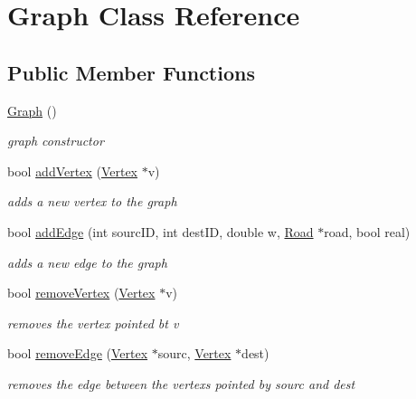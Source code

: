 \hypertarget{class_graph}{}\section{Graph Class Reference}
\label{class_graph}
\subsection*{Public Member Functions}
\begin{DoxyCompactItemize}
\item 
\hypertarget{class_graph_ae4c72b8ac4d693c49800a4c7e273654f}{}\label{class_graph_ae4c72b8ac4d693c49800a4c7e273654f} 
\hyperlink{class_graph_ae4c72b8ac4d693c49800a4c7e273654f}{Graph} ()
\begin{DoxyCompactList}\small\item\em graph constructor \end{DoxyCompactList}\item 
bool \hyperlink{class_graph_a59a5e666d2b7dc025704d7e6bce95c01}{add\+Vertex} (\hyperlink{class_vertex}{Vertex} $\ast$v)
\begin{DoxyCompactList}\small\item\em adds a new vertex to the graph \end{DoxyCompactList}\item 
bool \hyperlink{class_graph_a88d5bbd58c00151b0adc7b0c21c4fcd9}{add\+Edge} (int sourc\+ID, int dest\+ID, double w, \hyperlink{class_road}{Road} $\ast$road, bool real)
\begin{DoxyCompactList}\small\item\em adds a new edge to the graph \end{DoxyCompactList}\item 
bool \hyperlink{class_graph_ad3efda9573757644ea501c8078b5ee4b}{remove\+Vertex} (\hyperlink{class_vertex}{Vertex} $\ast$v)
\begin{DoxyCompactList}\small\item\em removes the vertex pointed bt v \end{DoxyCompactList}\item 
bool \hyperlink{class_graph_ae87923c630b6fb3d3fa087d5c27ad8ee}{remove\+Edge} (\hyperlink{class_vertex}{Vertex} $\ast$sourc, \hyperlink{class_vertex}{Vertex} $\ast$dest)
\begin{DoxyCompactList}\small\item\em removes the edge between the vertexs pointed by sourc and dest \end{DoxyCompactList}\item 

\end{DoxyCompactItemize}
